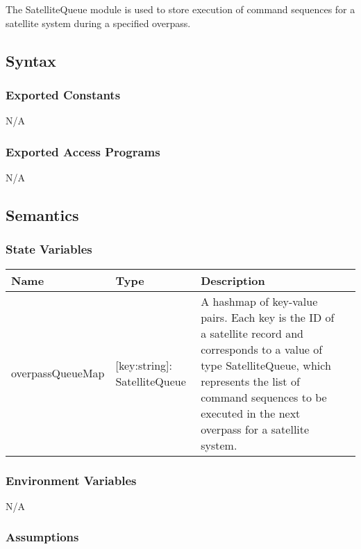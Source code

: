 \documentclass[12pt, titlepage]{article}
\begin{document}
The SatelliteQueue module is used to store execution of command sequences for a satellite system during a specified overpass.

\subsection{Syntax}

\subsubsection{Exported Constants}

N/A

\subsubsection{Exported Access Programs}

N/A

\subsection{Semantics}

\subsubsection{State Variables}

\begin{center}
\begin{tabular}{|p{4.8cm} |p{3cm} |p{5cm} |p{4cm}|}
\hline
\textbf{Name} & \textbf{Type} & \textbf{Description} \\
\hline
overpassQueueMap & { [key:string]:
   SatelliteQueue } & A hashmap of key-value pairs. Each key is the ID of a satellite record and corresponds to a value of type SatelliteQueue, which represents the list of command sequences to be executed in the next overpass for a satellite system.\\
\hline

\end{tabular}

\end{center}

\subsubsection{Environment Variables}
N/A


\subsubsection{Assumptions}
\end{document}
